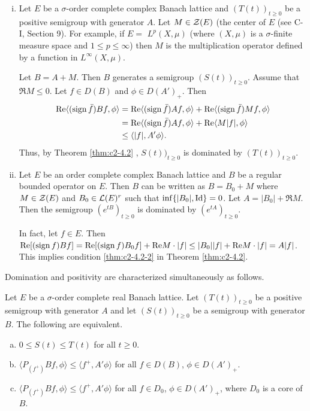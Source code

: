 \begin{example}\label{ex:c2-4.4}
\begin{enumerate}[(i), wide, labelsep=1em, itemindent=\parindent]
\item \label{ex:c2-4.4-1}
Let $E$ be a $\sigma$-order complete complex Banach lattice and $(T(t))_{t \geq 0}$ be a positive semigroup with generator $A$. 
Let $M \in \mathcal{Z}(E)$ (the center of $E$ (see C-I, Section 9). 
For example, if $E =$ $L^{p}(X,\mu)$ (where $(X,\mu)$ is a $\sigma$-finite measure space and $1 \leq p \leq \infty$) then $M$ is the multiplication operator defined by a function in $L^{\infty}(X,\mu)$.

Let $B = A + M$. Then $B$ generates a semigroup $(S(t))_{t \geq 0}$.
Assume that $\Re M \leq 0$. Let $f \in D(B)$ and $\phi \in D(A')_{+}$. Then
\begin{align*}
\mathop{}\!\mathrm{Re}\langle(\operatorname{sign}  \bar{f})Bf,\phi\rangle &= \mathop{}\!\mathrm{Re}\langle(\operatorname{sign}  \bar{f})Af,\phi\rangle + \mathop{}\!\mathrm{Re}\langle(\operatorname{sign}  \bar{f})Mf,\phi\rangle\\
&= \mathop{}\!\mathrm{Re}\langle(\operatorname{sign}  \bar{f})Af,\phi\rangle + \mathop{}\!\mathrm{Re}\langle M|f|,\phi\rangle\\
&\leq \langle|f|,A'\phi\rangle.
\end{align*}
Thus, by Theorem \ref{thm:c2-4.2}  , $S(t))_{t \geq 0}$ is dominated by $(T(t))_{t \geq 0}$.
\item \label{ex:c2-4.4-2}
Let $E$ be an order complete complex Banach lattice and $B$ be a regular bounded operator on $E$. 
Then $B$ can be written as $B = B_{0} + M$ where $M \in \mathcal{Z}(E)$ and $B_{0} \in \mathcal{L}(E)^{r}$ such that $\inf \{|B_{0}|, \operatorname{Id}\} = 0$.
Let $A = |B_{0}| + \Re  M$. 
Then the semigroup $(e^{tB})_{t \geq 0}$ is dominated by $(e^{tA})_{t \geq 0}$.

In fact, let $f \in E$. Then $\mathop{}\!\mathrm{Re}[(\operatorname{sign}  f)Bf] = \mathop{}\!\mathrm{Re}[(\operatorname{sign} f)B_{0}f] + \mathop{}\!\mathrm{Re} M \cdot |f| \leq |B_{0}||f| + \mathop{}\!\mathrm{Re} M \cdot |f| = A|f|$. 
This implies condition \ref{thm:c2-4.2-2} in Theorem \ref{thm:c2-4.2}.
\end{enumerate}
\end{example}

Domination and positivity are characterized simultaneously as
follows.

\begin{proposition}\label{prop:c2-4.5}
Let $E$ be a $\sigma$-order complete real Banach lattice.
Let $(T(t))_{t \geq 0}$ be a positive semigroup with generator $A$ and let
$(S(t))_{t \geq 0}$ be a semigroup with generator $B$. The following are equivalent.
\begin{enumerate}[(a)]
\item \label{prop:c2-4.5-1}
$0 \leq S(t) \leq T(t)$ for all $t \geq 0$.
\item \label{prop:c2-4.5-2}
$\langle P_{(f^{+})}Bf,\phi\rangle \leq \langle f^{+},A'\phi\rangle$ for all $f \in D(B)$, $\phi \in D(A')_{+}$.
\item \label{prop:c2-4.5-3}
$\langle P_{(f^{+})}Bf,\phi\rangle \leq \langle f^{+},A'\phi\rangle$ for all $f \in D_{0}$, $\phi \in D(A')_{+}$,
where $D_{0}$ is a core of $B$.
\end{enumerate}
\end{proposition}

